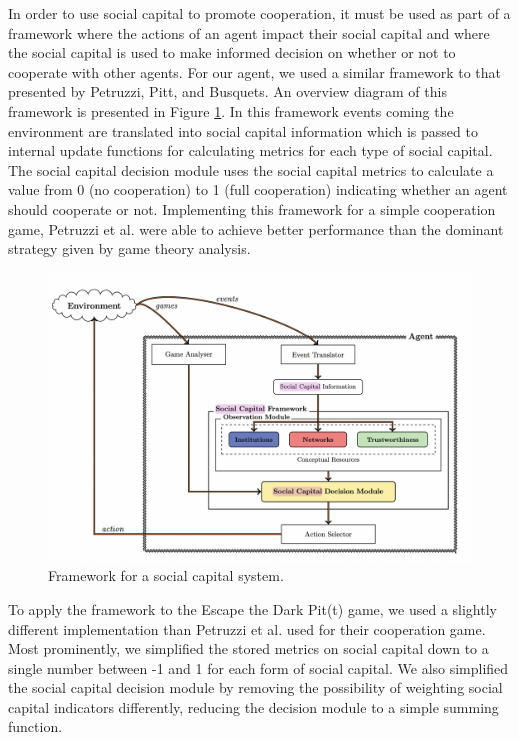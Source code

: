 In order to use social capital to promote cooperation, it must be used as part of a framework where the actions of an agent impact their social capital and where the social capital is used to make informed decision on whether or not to cooperate with other agents. For our agent, we used a similar framework to that presented by Petruzzi, Pitt, and Busquets\cite{complexity_reduction}. An overview diagram of this framework is presented in Figure \ref{fig:social_capital_framework}. In this framework events coming the environment are translated into social capital information which is passed to internal update functions for calculating metrics for each type of social capital. The social capital decision module uses the social capital metrics to calculate a value from 0 (no cooperation) to 1 (full cooperation) indicating whether an agent should cooperate or not. Implementing this framework for a simple cooperation game, Petruzzi et al. were able to achieve better performance than the dominant strategy given by game theory analysis. 

\begin{figure}[!h]
    \centering
    \includegraphics[width=0.75\linewidth]{004_team_1_agent_design/images/socialcapitalframework.png}
    \caption{Framework for a social capital system.\cite{pitt}}
    \label{fig:social_capital_framework}
\end{figure}

To apply the framework to the Escape the Dark Pit(t) game, we used a slightly different implementation than Petruzzi et al. used for their cooperation game. Most prominently, we simplified the stored metrics on social capital down to a single number between -1 and 1 for each form of social capital. We also simplified the social capital decision module by removing the possibility of weighting social capital indicators differently, reducing the decision module to a simple summing function. 

